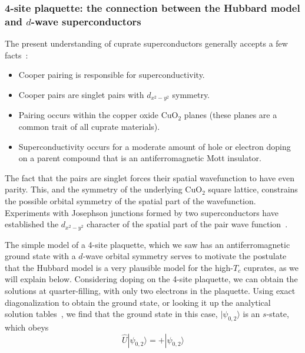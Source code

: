 \subsubsection{4-site plaquette: the connection between the Hubbard model and
$d$-wave superconductors} 

The present understanding of cuprate superconductors generally accepts a few
facts~\cite{leggett2006quantum}: 
\begin{itemize}

\item Cooper pairing is responsible for superconductivity.

\item Cooper pairs are singlet pairs with $d_{x^{2}-y^{2}}$ symmetry.  

\item Pairing occurs within the copper oxide CuO$_{2}$ planes (these planes are
a common trait of all cuprate materials).
 
\item Superconductivity occurs for a moderate amount of hole or electron doping
on a parent compound that is an antiferromagnetic Mott insulator.  
\end{itemize} 
The fact that the pairs are singlet forces their spatial wavefunction to have
even parity.  This, and the symmetry of the underlying CuO$_{2}$ square
lattice, constrains the possible orbital symmetry of the spatial part of the
wavefunction.  Experiments with Josephson junctions formed by two
superconductors have established the $d_{x^{2}-y^{2}}$ character of the spatial
part of the pair wave function~\cite{Tsuei1997,RevModPhys.72.969}.  

The simple model of a 4-site plaquette, which we saw has an antiferromagnetic
ground state with a $d$-wave orbital symmetry serves to motivate the postulate
that the Hubbard model is a very plausible model for the high-$T_{c}$ cuprates,
as we will explain below.    Considering doping on the 4-site plaquette, we can
obtain the solutions at quarter-filling, with only two electrons in the
plaquette.  Using exact diagonalization to obtain the ground state, or looking
it  up the analytical solution tables~\cite{Schumman2008arxiv},   we find that
the ground state in this case, $|\psi_{0,2}\rangle$ is an $s$-state, which
obeys 
\begin{equation}
  \hat{U} | \psi_{0,2} \rangle = + | \psi_{0,2} \rangle
\end{equation}
 
